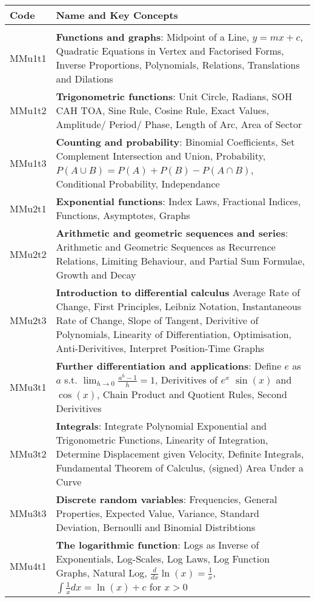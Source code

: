 \documentclass[varwidth=144mm, 12pt]{standalone}
\begin{document}
\begin{longtable}{lp{}}
Code & \textbf{Name} and Key Concepts \\ \hline
& \\ \endhead
MMu1t1 & \textbf{Functions and graphs}: Midpoint of a Line, $y = mx + c$, Quadratic Equations in Vertex and Factorised Forms, Inverse Proportions, Polynomials, Relations, Translations and Dilations \\
MMu1t2 & \textbf{Trigonometric functions}: Unit Circle, Radians, SOH CAH TOA, Sine Rule, Cosine Rule, Exact Values, Amplitude/ Period/ Phase, Length of Arc, Area of Sector \\
MMu1t3 & \textbf{Counting and probability}: Binomial Coefficients, Set Complement Intersection and Union, Probability, $P(A\cup{}B) = P(A) + P(B) - P(A\cap{}B)$, Conditional Probability, Independance \\
MMu2t1 & \textbf{Exponential functions}: Index Laws, Fractional Indices, Functions, Asymptotes, Graphs \\
MMu2t2 & \textbf{Arithmetic and geometric sequences and series}: Arithmetic and Geometric Sequences as Recurrence Relations, Limiting Behaviour, and Partial Sum Formulae, Growth and Decay \\
MMu2t3 & \textbf{Introduction to differential calculus} Average Rate of Change, First Principles, Leibniz Notation, Instantaneous Rate of Change, Slope of Tangent, Derivitive of Polynomials, Linearity of Differentiation, Optimisation, Anti-Derivitives, Interpret Position-Time Graphs \\
MMu3t1 & \textbf{Further differentiation and applications}: Define $e$ as $a$ s.t. $\lim_{h \to 0} \frac{a^h - 1}{h} = 1$, Derivitives of $e^x$ $\sin(x)$ and $\cos(x)$, Chain Product and Quotient Rules, Second Derivitives \\
MMu3t2 & \textbf{Integrals}: Integrate Polynomial Exponential and Trigonometric Functions, Linearity of Integration,  Determine Displacement given Velocity, Definite Integrals, Fundamental Theorem of Calculus, (signed) Area Under a Curve \\
MMu3t3 & \textbf{Discrete random variables}: Frequencies, General Properties, Expected Value, Variance, Standard Deviation, Bernoulli and Binomial Distribtions \\
MMu4t1 & \textbf{The logarithmic function}: Logs as Inverse of Exponentials, Log-Scales, Log Laws, Log Function Graphs, Natural Log, $\frac{d}{dx}\ln(x) = \frac{1}{x}$, $\int{\frac{1}{x}dx} = \ln(x) + c$ for $x > 0$ \\

\end{longtable}
\end{document}
